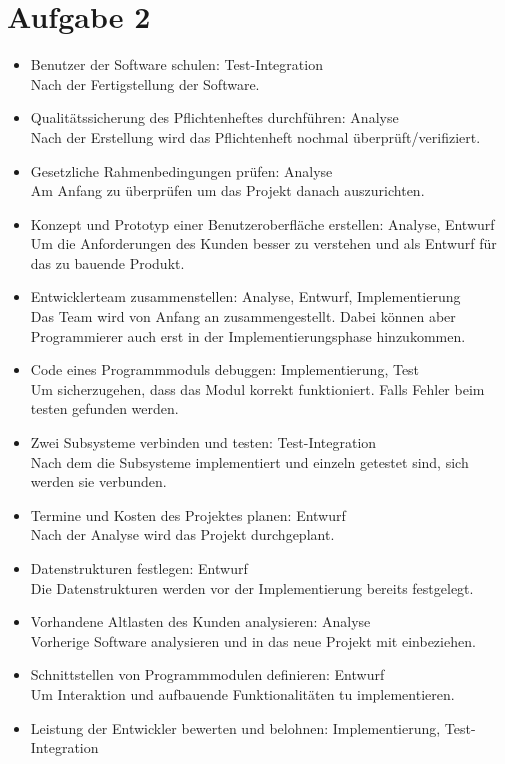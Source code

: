 \documentclass[a4paper,12pt]{article}
\newcommand{\aufgabe}[1]{\section*{Aufgabe #1}}
\begin{document}
\aufgabe{2}
\begin{itemize}
\item Benutzer der Software schulen: Test-Integration\\
Nach der Fertigstellung der Software.
\item Qualitätssicherung des Pflichtenheftes durchführen: Analyse\\
Nach der Erstellung wird das Pflichtenheft nochmal überprüft/verifiziert.
\item Gesetzliche Rahmenbedingungen prüfen: Analyse\\
Am Anfang zu überprüfen um das Projekt danach auszurichten.
\item Konzept und Prototyp einer Benutzeroberfläche erstellen: Analyse, Entwurf\\
Um die Anforderungen des Kunden besser zu verstehen und als Entwurf für das zu bauende Produkt.
\item Entwicklerteam zusammenstellen: Analyse, Entwurf, Implementierung\\
Das Team wird von Anfang an zusammengestellt. Dabei können aber Programmierer auch erst in der Implementierungsphase hinzukommen. 
\item Code eines Programmmoduls debuggen: Implementierung, Test\\
Um sicherzugehen, dass das Modul korrekt funktioniert. Falls Fehler beim testen gefunden werden.
\item Zwei Subsysteme verbinden und testen: Test-Integration\\
Nach dem die Subsysteme implementiert und einzeln getestet sind, sich werden sie verbunden.
\item Termine und Kosten des Projektes planen: Entwurf\\
Nach der Analyse wird das Projekt durchgeplant.
\item Datenstrukturen festlegen: Entwurf\\
Die Datenstrukturen werden vor der Implementierung bereits festgelegt.
\item Vorhandene Altlasten des Kunden analysieren: Analyse\\
Vorherige Software analysieren und in das neue Projekt mit einbeziehen.
\item Schnittstellen von Programmmodulen definieren: Entwurf\\
Um Interaktion und aufbauende Funktionalitäten tu implementieren.  
\item Leistung der Entwickler bewerten und belohnen: Implementierung, Test-Integration\\

\end{itemize}
\end{document}
